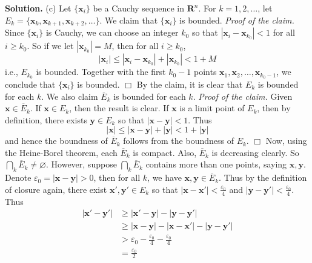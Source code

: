 \documentclass[12pt]{article}
\theoremstyle{definition}
\begin{document}
\smallskip
\noindent\textbf{Solution.}\quad
(c) Let $\{\mathbf{x}_i\}$ be a Cauchy sequence in $\mathbf{R}^n$. For $k=1,2,\ldots$, let $E_k=\{\mathbf{x}_{k},\mathbf{x}_{k+1},\mathbf{x}_{k+2},\ldots\}$. We claim that $\{\mathbf{x}_i\}$ is bounded.
\textit{Proof of the claim.} Since $\{\mathbf{x}_i\}$ is Cauchy, we can choose an integer $k_0$ so that $\left\vert\mathbf{x}_i-\mathbf{x}_{k_0}\right\vert<1$ for all $i\ge k_0$. So if we let $\left\vert\mathbf{x}_{k_0}\right\vert=M$, then for all $i\ge k_0$,
$$
\left\vert\mathbf{x}_i\right\vert
\le \left\vert\mathbf{x}_i-\mathbf{x}_{k_0}\right\vert+\left\vert\mathbf{x}_{k_0}\right\vert
<1+M
$$
i.e., $E_{k_0}$ is bounded. Together with the first $k_0-1$ points $\mathbf{x}_1,\mathbf{x}_2,\ldots,\mathbf{x}_{k_0-1}$, we conclude that $\{\mathbf{x}_i\}$ is bounded. $\Box$
By the claim, it is clear that $E_k$ is bounded for each $k$. We also claim $\overline{E}_k$ is bounded for each $k$.
\textit{Proof of the claim.} Given $\mathbf{x}\in\overline{E}_k$. If $\mathbf{x}\in E_k$, then the result is clear. If $\mathbf{x}$ is a limit point of $E_k$, then by definition, there exists $\mathbf{y}\in E_k$ so that $\left\vert\mathbf{x}-\mathbf{y}\right\vert<1$. Thus
$$
\left\vert\mathbf{x}\right\vert
\le\left\vert\mathbf{x}-\mathbf{y}\right\vert+\left\vert\mathbf{y}\right\vert
<1+\left\vert\mathbf{y}\right\vert
$$
and hence the boundness of $\overline{E}_k$ follows from the boundness of $E_k$. $\Box$
Now, using the Heine-Borel theorem, each $\overline{E}_k$ is compact. Also, $\overline{E}_k$ is decreasing clearly. So $\bigcap_{k} \overline{E}_k\ne\varnothing$. However, suppose $\bigcap_{k} \overline{E}_k$ contains more than one points, saying $\mathbf{x},\mathbf{y}$. Denote $\varepsilon_0=\left\vert\mathbf{x}-\mathbf{y}\right\vert>0$, then for all $k$, we have $\mathbf{x},\mathbf{y}\in\overline{E}_k$. Thus by the definition of closure again, there exist $\mathbf{x}',\mathbf{y}'\in E_k$ so that $\left\vert\mathbf{x}-\mathbf{x}'\right\vert<\frac{\varepsilon_0}{4}$ and $\left\vert\mathbf{y}-\mathbf{y}'\right\vert<\frac{\varepsilon_0}{4}$. Thus
\begin{align*}
\left\vert\mathbf{x}'-\mathbf{y}'\right\vert
&\ge \left\vert\mathbf{x}'-\mathbf{y}\right\vert
-\left\vert\mathbf{y}-\mathbf{y}'\right\vert\\
&\ge\left\vert\mathbf{x}-\mathbf{y}\right\vert
-\left\vert\mathbf{x}-\mathbf{x}'\right\vert
-\left\vert\mathbf{y}-\mathbf{y}'\right\vert\\
&>\varepsilon_0-\frac{\varepsilon_0}{4}-\frac{\varepsilon_0}{4}\\
&=\frac{\varepsilon_0}{2}
\end{align*}
\end{document}
